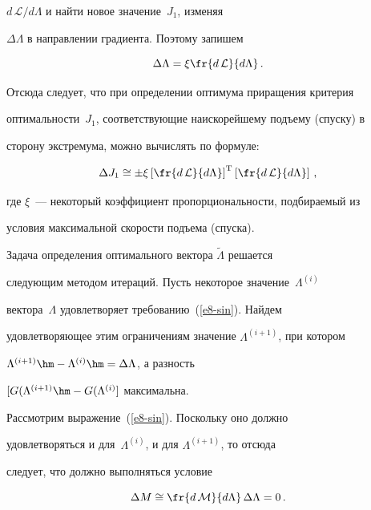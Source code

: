 $d\,\mathcal{L}/d\Lambda$ и найти новое значение~$J_1$, изменяя

$\Delta\Lambda$ в направлении градиента. Поэтому запишем

     \begin{equation}

     \Delta\Lambda = \xi \fr{d\,\mathcal{L}}{d\Lambda}\,.

     \label{e12-sin}

     \end{equation}

     Отсюда следует, что при определении оптимума приращения критерия

оптимальности~$J_1$, соответствующие наискорейшему подъему (спуску) в

сторону экстремума, можно вычислять по формуле:

     \begin{equation*}

     \Delta J_1\cong \pm \xi \left[ \fr{d\,\mathcal{L}}{d\Lambda}

\right]^{\mathrm{T}}  \left[ \fr{d\,\mathcal{L}}{d\Lambda}\right]\,,


     \end{equation*}

где $\xi$~--- некоторый коэффициент пропорциональности, подбираемый из

условия максимальной скорости подъема (спуска).



     Задача определения оптимального вектора $\tilde{\Lambda}$ решается

следующим методом итераций. Пусть некоторое значение~$\Lambda^{(i)}$

вектора~$\Lambda$ удовлетворяет требованию~(\ref{e8-sin}). Найдем

удовлетворяющее этим ограничениям значение $\Lambda^{(i+1)}$, при котором

$\Lambda^{(i+1)}\hm- \Lambda^{(i)} \hm= \Delta\Lambda$, а разность

$[G(\Lambda^{(i+1)}\hm- G(\Lambda^{(i)}]$ максимальна.



     Рассмотрим выражение~(\ref{e8-sin}). Поскольку оно должно

удовлетворяться и для~$\Lambda^{(i)}$, и для $\Lambda^{(i+1)}$, то отсюда

следует, что должно выполняться условие

     \begin{equation*}

     \Delta{M}\cong  \fr{d\,\mathcal{M}}{d\Lambda} \,\Delta\Lambda =0\,.


     \end{equation*}

